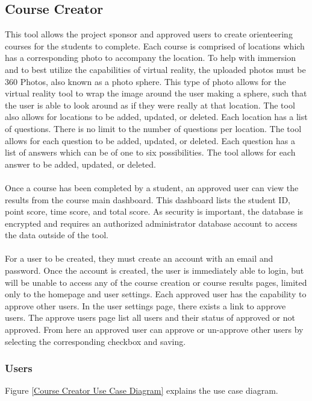 \subsection{Course Creator}
This tool allows the project sponsor and approved users to create orienteering courses for the students to complete. Each course is comprised of locations which has a corresponding photo to accompany the location. To help with immersion and to best utilize the capabilities of virtual reality, the uploaded photos must be 360 Photos, also known as a photo sphere. This type of photo allows for the virtual reality tool to wrap the image around the user making a sphere, such that the user is able to look around as if they were really at that location. The tool also allows for locations to be added, updated, or deleted. Each location has a list of questions. There is no limit to the number of questions per location. The tool allows for each question to be added, updated, or deleted. Each question has a list of answers which can be of one to six possibilities. The tool allows for each answer to be added, updated, or deleted. \\
\\
Once a course has been completed by a student, an approved user can view the results from the course main dashboard. This dashboard lists the student ID, point score, time score, and total score. As security is important, the database is encrypted and requires an authorized administrator database account to access the data outside of the tool. \\
\\
For a user to be created, they must create an account with an email and password. Once the account is created, the user is immediately able to login, but will be unable to access any of the course creation or course results pages, limited only to the homepage and user settings. Each approved user has the capability to approve other users. In the user settings page, there exists a link to approve users. The approve users page list all users and their status of approved or not approved. From here an approved user can approve or un-approve other users by selecting the corresponding checkbox and saving. \textsl{}


\subsubsection{Users}
Figure \ref{Course Creator Use Case Diagram} explains the use case diagram.

